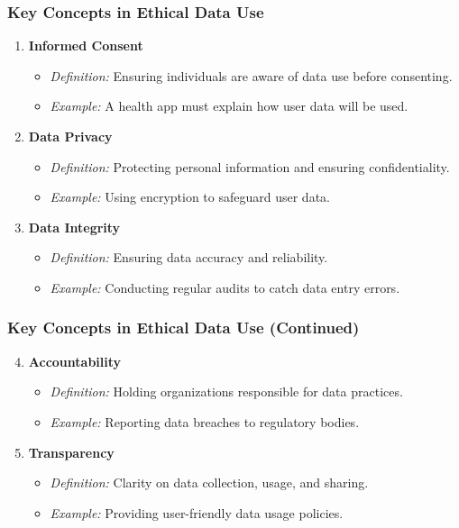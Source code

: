 \documentclass[aspectratio=169]{beamer}
\begin{document}
\begin{frame}[fragile]
    \frametitle{Key Concepts in Ethical Data Use}
    \begin{enumerate}
        \item \textbf{Informed Consent}
        \begin{itemize}
            \item \textit{Definition:} Ensuring individuals are aware of data use before consenting.
            \item \textit{Example:} A health app must explain how user data will be used.
        \end{itemize}

        \item \textbf{Data Privacy}
        \begin{itemize}
            \item \textit{Definition:} Protecting personal information and ensuring confidentiality.
            \item \textit{Example:} Using encryption to safeguard user data.
        \end{itemize}

        \item \textbf{Data Integrity}
        \begin{itemize}
            \item \textit{Definition:} Ensuring data accuracy and reliability.
            \item \textit{Example:} Conducting regular audits to catch data entry errors.
        \end{itemize}
    \end{enumerate}
\end{frame}

\begin{frame}[fragile]
    \frametitle{Key Concepts in Ethical Data Use (Continued)}
    \begin{enumerate}
        \setcounter{enumi}{3}  %
        \item \textbf{Accountability}
        \begin{itemize}
            \item \textit{Definition:} Holding organizations responsible for data practices.
            \item \textit{Example:} Reporting data breaches to regulatory bodies.
        \end{itemize}

        \item \textbf{Transparency}
        \begin{itemize}
            \item \textit{Definition:} Clarity on data collection, usage, and sharing.
            \item \textit{Example:} Providing user-friendly data usage policies.
        \end{itemize}
    \end{enumerate}
\end{frame}
\end{document}
